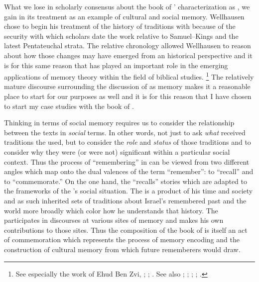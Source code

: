 What we lose in scholarly consensus about the book of \chronicles' characterization as \rwb, we gain in its treatment as an example of cultural and social memory. Wellhausen chose to begin his treatment of the history of traditions with \chronicles because of the security with which scholars date the work relative to Samuel--Kings and the latest Pentateuchal strata. The relative chronology allowed Wellhausen to reason about how those changes may have emerged from an historical perspective and it is for this same reason that \chronicles has played an important role in the emerging applications of memory theory within the field of biblical studies.%
\footnote{%
    See especially the work of Ehud Ben Zvi,
    \cite*{benzvi_st2017};
    \cite*{benzvi-a_evans-williams2013};
    \cite*{benzvi-b_evans-williams2013}.
    See also \cite{wilson2017};
    \cite[26--30]{rogerson2010};
    \cite[104--114]{blenkinsopp2013};
    \cite[148-166]{wright2014};
    \cite{jarick_frohlich2019}.
    }
The relatively mature discourse surrounding the discussion of \chronicles as memory makes it a reasonable place to start for our purposes as well and it is for this reason that I have chosen to start my case studies with the book of \chronicles.

Thinking in terms of social memory requires us to consider the relationship between the texts in \emph{social} terms. In other words, not just to ask \emph{what} received traditions the \chronicler used, but to consider the \emph{role} and \emph{status} of those traditions and to consider why they were (or were not) significant within a particular social context. Thus the process of ``remembering'' in \chronicles can be viewed from two different angles which map onto the dual valences of the term ``remember'': to ``recall'' and to ``commemorate.'' On the one hand, the \chronicler ``recalls'' stories which are adapted to the frameworks of the \chronicler's social situation. The \chronicler is a product of his time and society and as such inherited sets of traditions about Israel's remembered past and the world more broadly which color how he understands that history. The \chronicler participates in discourses at various sites of memory and makes his own contributions to those sites. Thus the composition of the book of \chronicles is itself an act of commemoration which represents the process of memory encoding and the construction of cultural memory from which future rememberers would draw.

